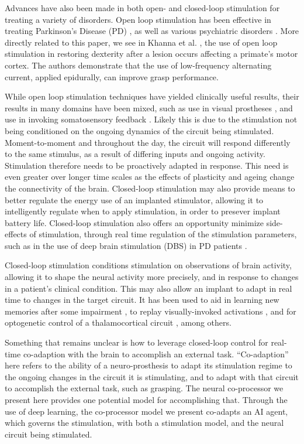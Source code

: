\documentclass[12pt]{iopart}
\begin{document}
Advances have also been made in both open- and closed-loop stimulation for
treating a variety of disorders. Open loop stimulation has been effective in
treating Parkinson's Disease (PD) \cite{benabid.parkinsons}, as well as various
psychiatric disorders \cite{holtzheimer.psy, kisely.psy, fraint.psy}.
More directly related to this paper, we see in Khanna et al. \cite{khanna.openloop},
the use of open loop stimulation in restoring dexterity after a lesion
occurs affecting a primate's motor cortex. The authors demonstrate that
the use of low-frequency alternating current, applied epidurally,
can improve grasp performance.

While open loop stimulation techniques have yielded clinically useful results,
their results in many domains have been mixed, such as use in visual
prostheses \cite{bosking.visual}, and use in invoking somatosensory feedback
\cite{cronin.tact}. Likely this is due to the stimulation not being conditioned
on the ongoing dynamics of the circuit being stimulated. Moment-to-moment and
throughout the day, the circuit will respond differently to the same stimulus,
as a result of differing inputs and ongoing activity. Stimulation
therefore needs to be proactively adapted in response. This need is even
greater over longer time scales as the effects of plasticity and ageing change
the connectivity of the brain. Closed-loop stimulation may also provide means
to better regulate the energy use of an implanted stimulator, allowing it to
intelligently regulate when to apply stimulation, in order to presever implant
battery life. Closed-loop stimulation also offers an opportunity minimize
side-effects of stimulation, through real time regulation
of the stimulation parameters, such as in the use of deep brain stimulation (DBS) in
PD patients \cite{little.park}.

Closed-loop stimulation conditions stimulation on observations of brain activity,
allowing it to shape the neural activity more precisely, and in response to changes
in a patient's clinical condition. This may also allow an implant to adapt
in real time to changes in the target circuit. It has been used to aid in learning
new memories after some impairment \cite{berger.closedloop, kahana.biomarker},
to replay visually-invoked activations \cite{tafazoli.acls}, and for optogenetic
control of a thalamocortical circuit \cite{bolus.opto}, among others.

Something that remains unclear is how to leverage closed-loop control for real-time
co-adaption with the brain to accomplish an external task. ``Co-adaption'' here refers
to the ability of a neuro-prosthesis to adapt its stimulation regime to the ongoing
changes in the circuit it is stimulating, and to adapt with that circuit to accomplish
the external task, such as grasping. The neural co-processor we present here provides one
potential model for accomplishing that. Through the use of deep learning, the
co-processor model we present co-adapts an AI agent, which governs the
stimulation, with both a stimulation model, and the neural circuit being stimulated.
\end{document}
